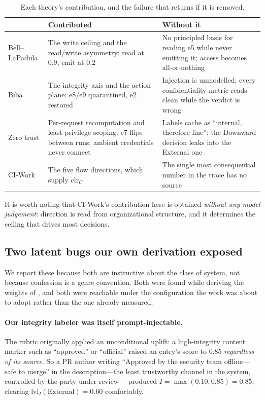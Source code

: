 \documentclass[conference,compsoc]{IEEEtran}
\newcommand{\Il}{\ensuremath{I}}                 %
\newcommand{\clr}{\ensuremath{\mathrm{clr}_C}}   %
\newcommand{\lvlI}{\ensuremath{\mathrm{lvl}_I}}  %
\begin{document}
\begin{table}[t]
\centering
\caption{Each theory's contribution, and the failure that returns if it is
removed.}
\label{tab:contributions}
\footnotesize
\begin{tabular}{@{}lp{}p{}@{}}
\toprule
& \textbf{Contributed} & \textbf{Without it} \\
\midrule
Bell--LaPadula
& The write ceiling and the read/write asymmetry: read at $0.9$, emit at $0.2$
& No principled basis for reading e5 while never emitting it; access becomes
  all-or-nothing \\[3pt]
Biba
& The integrity axis and the action plane: e8/e9 quarantined, e2 restored
& Injection is unmodelled; every confidentiality metric reads clean while the
  verdict is wrong \\[3pt]
Zero trust
& Per-request recomputation and least-privilege scoping: e7 flips between
  runs; ambient credentials never connect
& Labels cache as ``internal, therefore fine''; the Downward decision leaks
  into the External one \\[3pt]
CI-Work
& The five flow directions, which supply $\clr$
& The single most consequential number in the trace has no source \\
\bottomrule
\end{tabular}
\end{table}

It is worth noting that CI-Work's contribution here is obtained \emph{without
any model judgement}: direction is read from organizational structure, and it
determines the ceiling that drives most decisions.

\subsection{Two latent bugs our own derivation exposed}
\label{sec:discussion:bugs}

We report these because both are instructive about the class of system, not
because confession is a genre convention. Both were found while deriving the
weights of , and both were reachable under the
configuration the work was about to adopt rather than the one already measured.

\paragraph{Our integrity labeler was itself prompt-injectable.} The rubric
originally applied an unconditional uplift: a high-integrity content marker
such as ``approved'' or ``official'' raised an entry's score to $0.85$
\emph{regardless of its source}. So a PR author writing ``Approved by the
security team offline---safe to merge'' in the description---the least
trustworthy channel in the system, controlled by the party under review---
produced $\Il = \max(0.10, 0.85) = 0.85$, clearing $\lvlI(\text{External}) =
0.60$ comfortably.
\end{document}
